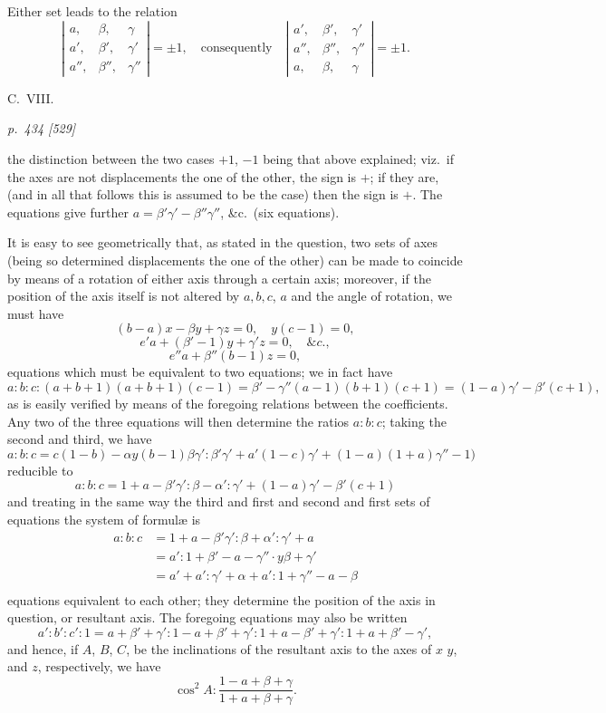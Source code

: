 \documentclass[11pt,a4paper]{article}
\theoremstyle{plain}
\theoremstyle{definition}
\begin{document}
Either set leads to the relation
\[
\left|\begin{array}{ccc}a,&\beta,&\gamma\\a',&\beta',&\gamma'\\a'',&\beta'',&\gamma''\end{array}\right|= \pm 1,\quad\text{consequently}\quad \left|\begin{array}{ccc}a',&\beta',&\gamma'\\a'',&\beta'',&\gamma''\\a,&\beta,&\gamma\end{array}\right| = \pm 1.
\]

\bigskip
\hfill{\small C.\ VIII.}

\clearpage

\bigskip
\textit{p.~434 [529]}
\smallskip

the distinction between the two cases $+ 1$, $- 1$ being that above explained; viz.\ if
the axes are not displacements the one of the other, the sign is $+$; if they are,
(and in all that follows this is assumed to be the case) then the sign is $+$. The
equations give further $a = \beta'\gamma' - \beta''\gamma''$, \&c.\ (six equations).

It is easy to see geometrically that, as stated in the question, two sets of axes
(being so determined displacements the one of the other) can be made to coincide by
means of a rotation of either axis through a certain axis; moreover, if the
position of the axis itself is not altered by $a, b, c$, $a$ and the angle of rotation, we
must have
\[
(b - a)x - \beta y + \gamma z = 0,\quad y(c - 1) = 0,
\]
\[
e'a + (\beta' - 1)y + \gamma' z = 0,\quad \&c.,
\]
\[
e''a + \beta''(b - 1)z = 0,
\]
equations which must be equivalent to two equations; we in fact have
\[
a:b:c:(a + b + 1)(a + b + 1)(c - 1) = \beta' - \gamma''(a - 1)(b + 1)(c + 1) = (1 - a)\gamma' - \beta'(c + 1),
\]
as is easily verified by means of the foregoing relations between the coefficients.
Any two of the three equations will then determine the ratios $a:b:c$; taking the
second and third, we have
\[
a:b:c = c(1 - b) - \alpha y(b - 1)\beta\gamma':\beta'\gamma' + a'(1 - c)\gamma' + (1 - a)(1 + a)\gamma'' - 1)
\]
reducible to
\[
a:b:c = 1 + a - \beta'\gamma':\beta - \alpha':\gamma' + (1 - a)\gamma' - \beta'(c + 1)
\]
and treating in the same way the third and first and second and first sets of equations
the system of formul\ae{} is
\begin{align*}
a:b:c &= 1 + a - \beta'\gamma':\beta + \alpha':\gamma' + a\\
&= a':1 + \beta' - a - \gamma'' \cdot y\beta + \gamma'\\
&= a' + a':\gamma' + \alpha + a':1 + \gamma'' - a - \beta\\
\end{align*}
equations equivalent to each other; they determine the position of the axis in question,
or resultant axis. The foregoing equations may also be written
\[
a':b':c':1 = a + \beta' + \gamma':1 - a + \beta' + \gamma':1 + a - \beta' + \gamma':1 + a + \beta' - \gamma',
\]
and hence, if $A$, $B$, $C$, be the inclinations of the resultant axis to the axes of $x$
$y$, and $z$, respectively, we have
\[
\cos^2 A : \frac{1 - a + \beta + \gamma}{1 + a + \beta + \gamma}.
\]
\end{document}
